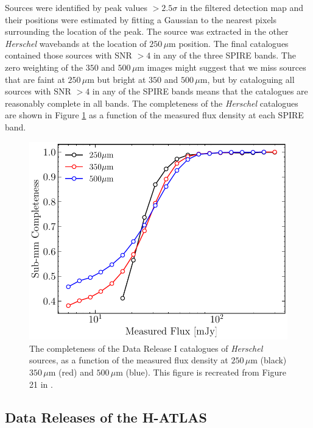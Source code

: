 Sources were identified by peak values $> 2.5\sigma$ in the filtered detection map and their positions were estimated by fitting a Gaussian to the nearest pixels surrounding the location of the peak. The source was extracted in the other \textit{Herschel} wavebands at the location of $250\,\mu$m position. The final catalogues contained those sources with SNR $> 4$ in any of the three SPIRE bands. The zero weighting of the $350$ and $500\,\mu$m images might suggest that we miss sources that are faint at $250\,\mu$m but bright at $350$ and $500\,\mu$m, but by cataloguing all sources with SNR $> 4$ in any of the SPIRE bands means that the catalogues are reasonably complete in all bands. The completeness of the \textit{Herschel} catalogues are shown in Figure \ref{fig:submm_completeness} as a function of the measured flux density at each SPIRE band.

\begin{figure}
    \centering
	\includegraphics[width=0.75\columnwidth]{Figures/submm_completeness.pdf}
	\caption[Completeness of H-ATLAS DR1 catalogue as a function of $250\,\mu$m flux]{The completeness of the Data Release I catalogues of \textit{Herschel} sources, as a function of the measured flux density at $250\,\mu$m (black) $350\,\mu$m (red) and $500\,\mu$m (blue). This figure is recreated from Figure 21 in \citealt{Valiante_2016}.}
	\label{fig:submm_completeness}
\end{figure}

\subsection{Data Releases of the H-ATLAS}
\label{sec:Data Releases of the H-ATLAS}

